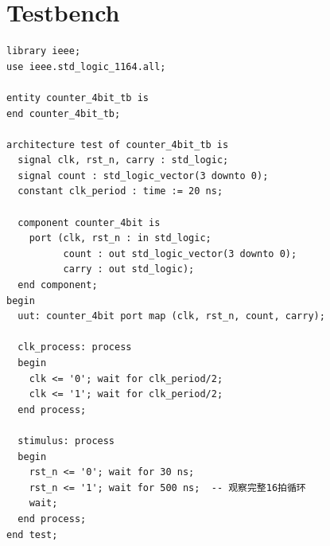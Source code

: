 \section{Testbench}

\begin{lstlisting}[caption={4位计数器Testbench}]
library ieee;
use ieee.std_logic_1164.all;

entity counter_4bit_tb is
end counter_4bit_tb;

architecture test of counter_4bit_tb is
  signal clk, rst_n, carry : std_logic;
  signal count : std_logic_vector(3 downto 0);
  constant clk_period : time := 20 ns;

  component counter_4bit is
    port (clk, rst_n : in std_logic;
          count : out std_logic_vector(3 downto 0);
          carry : out std_logic);
  end component;
begin
  uut: counter_4bit port map (clk, rst_n, count, carry);

  clk_process: process
  begin
    clk <= '0'; wait for clk_period/2;
    clk <= '1'; wait for clk_period/2;
  end process;

  stimulus: process
  begin
    rst_n <= '0'; wait for 30 ns;
    rst_n <= '1'; wait for 500 ns;  -- 观察完整16拍循环
    wait;
  end process;
end test;
\end{lstlisting}
